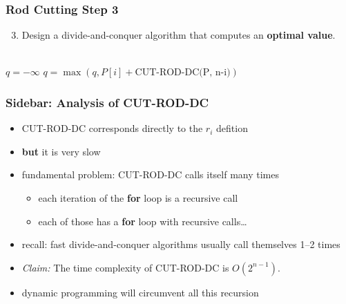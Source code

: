 \documentclass{beamer}
\newcommand{\stanza}{ \\~\ }
\begin{document}
\begin{frame} \frametitle{Rod Cutting Step 3}
  \begin{enumerate}
    \setcounter{enumi}{2}
    \item Design a divide-and-conquer algorithm that computes an \textbf{optimal value}.
    \stanza
  \end{enumerate}

  \begin{algorithmic}[1]
      \State {}
    \EndIf
    \State $q = -\infty$
      \State $q = \max(q, P[i] + \text{CUT-ROD-DC(P, n-i)})$
    \EndFor
    \State {}
    \EndFunction
  \end{algorithmic}
\end{frame}

\begin{frame} \frametitle{Sidebar: Analysis of CUT-ROD-DC}
\begin{itemize}
  \item CUT-ROD-DC corresponds directly to the $r_i$ defition
  \item \textbf{but} it is very slow
  \item fundamental problem: CUT-ROD-DC calls itself many times
  \begin{itemize}
    \item each iteration of the \textbf{for} loop is a recursive call
    \item each of those has a \textbf{for} loop with recursive calls\ldots
  \end{itemize}
  \item recall: fast divide-and-conquer algorithms usually call themselves 1--2 times
  \item \emph{Claim:} The time complexity of CUT-ROD-DC is $O(2^{n-1}).$
  \item dynamic programming will circumvent all this recursion
\end{itemize}
\end{frame}
\end{document}
